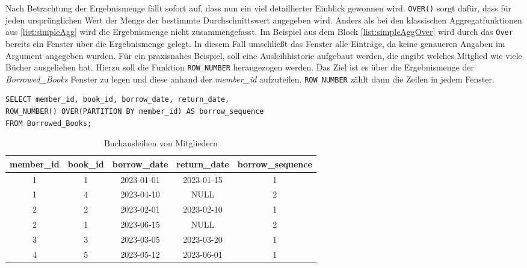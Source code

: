 Nach Betrachtung der Ergebnismenge fällt sofort auf, dass nun ein viel detaillierter
Einblick gewonnen wird. \texttt{OVER()} sorgt dafür, dass für jeden
ursprünglichen Wert der Menge der bestimmte Durchschnittswert angegeben wird. Anders
als bei den klassischen Aggregatfunktionen aus \ref{list:simpleAgg} wird die Ergebnismenge
nicht zusammengefasst. Im Beispiel aus dem Block \ref{list:simpleAggOver} wird
durch das \texttt{Over} bereits ein Fenster über die Ergebnismenge gelegt. In
diesem Fall umschließt das Fenster alle Einträge, da keine genaueren Angaben im Argument
angegeben wurden. Für ein praxisnahes Beispiel, soll eine Ausleihhistorie aufgebaut
werden, die angibt welches Mitglied wie viele Bücher ausgeliehen hat. Hierzu soll
die Funktion \texttt{ROW\_NUMBER} herangezogen werden. Das Ziel ist es über die Ergebnismenge
der \textit{Borrowed\_Books} Fenster zu legen und diese anhand der \textit{member\_id}
aufzuteilen. \texttt{ROW\_NUMBER} zählt dann die Zeilen in jedem Fenster.

 \begin{lstlisting}
SELECT member_id, book_id, borrow_date, return_date,
ROW_NUMBER() OVER(PARTITION BY member_id) AS borrow_sequence
FROM Borrowed_Books;
\end{lstlisting}
\begin{table}[h]
	\centering
	\begin{tabular}{|c|c|c|c|c|}
		\hline
		\textbf{member\_id} & \textbf{book\_id} & \textbf{borrow\_date} & \textbf{return\_date} & \textbf{borrow\_sequence} \\
		\hline
		1                   & 1                 & 2023-01-01            & 2023-01-15            & 1                         \\
		\hline
		1                   & 4                 & 2023-04-10            & NULL                  & 2                         \\
		\hline
		2                   & 2                 & 2023-02-01            & 2023-02-10            & 1                         \\
		\hline
		2                   & 1                 & 2023-06-15            & NULL                  & 2                         \\
		\hline
		3                   & 3                 & 2023-03-05            & 2023-03-20            & 1                         \\
		\hline
		4                   & 5                 & 2023-05-12            & 2023-06-01            & 1                         \\
		\hline
	\end{tabular}
	\caption{Buchausleihen von Mitgliedern}
	\label{tab:member_borrows}
\end{table}

